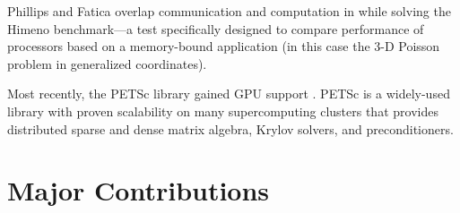 \documentclass[11pt]{report}
\begin{document}

Phillips and Fatica overlap communication and computation in \cite{Phillips2010} while solving the Himeno benchmark---a test specifically designed to compare performance of processors based on a memory-bound application (in this case the 3-D Poisson problem in generalized coordinates).  


Most recently, the PETSc library gained GPU support \cite{Minden2010,YokotaGPU2010}. PETSc is a widely-used library with proven scalability on many supercomputing clusters that provides distributed sparse and dense matrix algebra, Krylov solvers, and preconditioners. 




\section{Major Contributions}
\end{document}
